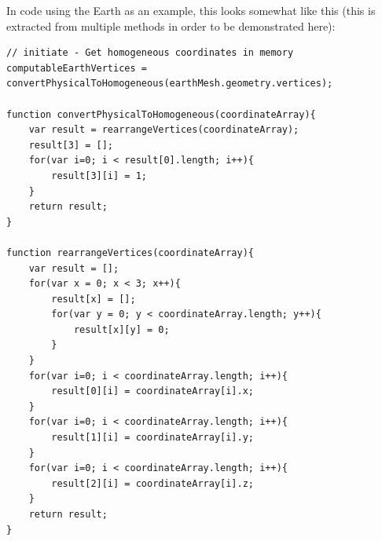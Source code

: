 \documentclass[12pt]{article}
\begin{document}
In code using the Earth as an example, this looks somewhat like this (this is extracted from multiple methods in order to be demonstrated here):

\begin{lstlisting}
// initiate - Get homogeneous coordinates in memory
computableEarthVertices = convertPhysicalToHomogeneous(earthMesh.geometry.vertices);

function convertPhysicalToHomogeneous(coordinateArray){
    var result = rearrangeVertices(coordinateArray);
    result[3] = [];
    for(var i=0; i < result[0].length; i++){
        result[3][i] = 1;
    }
    return result;
}

function rearrangeVertices(coordinateArray){
    var result = [];
    for(var x = 0; x < 3; x++){
        result[x] = [];    
        for(var y = 0; y < coordinateArray.length; y++){ 
            result[x][y] = 0;
        }  
    } 
    for(var i=0; i < coordinateArray.length; i++){
        result[0][i] = coordinateArray[i].x;
    }
    for(var i=0; i < coordinateArray.length; i++){
        result[1][i] = coordinateArray[i].y;
    }
    for(var i=0; i < coordinateArray.length; i++){
        result[2][i] = coordinateArray[i].z;
    }
    return result;
}
\end{lstlisting}
\end{document}
